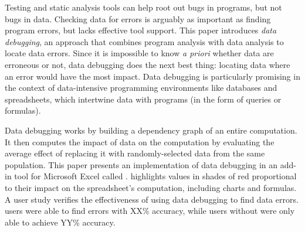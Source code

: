 Testing and static analysis tools can help root out bugs in programs,
but not bugs in data. Checking data for errors is arguably as
important as finding program errors, but lacks effective tool
support. This paper introduces \emph{data debugging}, an approach that
combines program analysis with data analysis to locate data
errors. Since it is impossible to know \emph{a priori} whether data
are erroneous or not, data debugging does the next best thing:
locating data where an error would have the most impact. Data
debugging is particularly promising in the context of data-intensive
programming environments like databases and spreadsheets, which
intertwine data with programs (in the form of queries or formulas).

Data debugging works by building a dependency graph of an entire
computation. It then computes the impact of data on the computation
by evaluating the average effect of replacing it with randomly-selected data
from the same population. This paper presents an implementation of data
debugging in an add-in tool for Microsoft Excel called \checkcell{}.
\checkcell{} highlights values in shades of red proportional to their impact on the
spreadsheet's computation, including charts and formulas. A user study
verifies the effectiveness of using data debugging to find data
errors. \checkcell{} users were able to find errors with XX\%
accuracy, while users without were only able to achieve YY\% accuracy.
